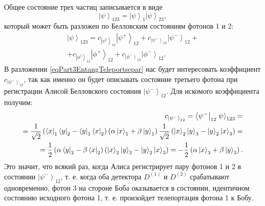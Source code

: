 Общее состояние трех частиц записывается в виде
\begin{equation}
  \left|\psi\right>_{123} = \left|\psi\right>_1 \left|\psi\right>_{23},
  \nonumber
\end{equation}
который может быть разложен по Белловским состояниям фотонов 1 и 2:
\begin{eqnarray}
\left|\psi\right>_{123} = 
c_{\left|\psi^{\dag}\right>_{12}}\left|\psi^{+}\right>_{12} +
c_{\left|\psi^{-}\right>_{12}}\left|\psi^{-}\right>_{12} +
\nonumber \\
+
c_{\left|\phi^{\dag}\right>_{12}}\left|\phi^{+}\right>_{12} +
c_{\left|\phi^{-}\right>_{12}}\left|\phi^{-}\right>_{12}.
\label{eqPart3EntangTeleportsepar}
\end{eqnarray}
В разложении \eqref{eqPart3EntangTeleportsepar} нас будет интересовать
коэффициент 
$c_{\left|\psi^{-}\right>_{12}}$, так как именно он будет описывать
состояние третьего фотона при регистрации Алисой Белловского состояния 
$\left|\psi^{-}\right>_{12}$. Для искомого коэффициента получим:
\begin{eqnarray}
  c_{\left|\psi^{-}\right>_{12}} = 
  \left<\psi^{-}\right|_{12} \left.\psi\right>_{123} = 
  \nonumber \\
  =
  \frac{1}{\sqrt{2}}
  \left(
  \bra{x}_1\bra{y}_2 - 
  \bra{y}_1\bra{x}_2
  \right)
  \left(
  \alpha \ket{x}_1 +
  \beta \ket{y}_1
  \right)
  \frac{1}{\sqrt{2}}
  \left(
  \ket{x}_2\ket{y}_3 - 
  \ket{y}_2\ket{x}_3
  \right) = 
  \nonumber \\
  = \frac{1}{2}
  \left(
  \alpha\bra{y}_2 - 
  \beta\bra{x}_2
  \right)
  \left(
  \ket{x}_2\ket{y}_3 - 
  \ket{y}_2\ket{x}_3
  \right) = 
  - \frac{1}{2}  
  \left(
  \alpha \ket{x}_3 +
  \beta \ket{y}_3
  \right).
\nonumber
\end{eqnarray}
Это значит, что всякий раз, когда Алиса регистрирует пару фотонов 1 и 2
в состоянии $\left|\psi^{-}\right>_{12}$, т. е. когда оба детектора
$D^{(1)}$ и $D^{(2)}$ срабатывают одновременно, фотон 3 на стороне
Боба оказывается в состоянии, идентичном состоянию исходного фотона 1,
т. е. произойдет телепортация фотона 1  к Бобу.


